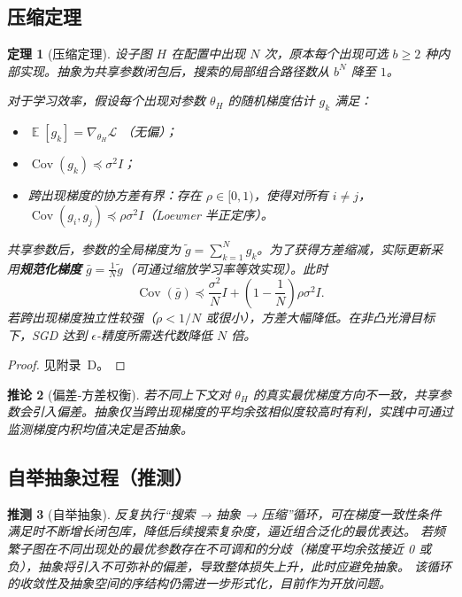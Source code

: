 \documentclass{ctexart}
\newtheorem{theorem}{定理}[section]
\newtheorem{corollary}[theorem]{推论}
\newtheorem{conjecture}[theorem]{推测}
\DeclareMathOperator{\Cov}{Cov}
\DeclareMathOperator{\E}{\mathbb{E}}
\begin{document}
\subsection{压缩定理}

\begin{theorem}[压缩定理]
设子图 $H$ 在配置中出现 $N$ 次，原本每个出现可选 $b\ge 2$ 种内部实现。抽象为共享参数闭包后，搜索的局部组合路径数从 $b^N$ 降至 $1$。

对于学习效率，假设每个出现对参数 $\theta_H$ 的随机梯度估计 $g_k$ 满足：
\begin{itemize}
    \item $\E[g_k] = \nabla_{\theta_H}\mathcal{L}$ （无偏）；
    \item $\Cov(g_k) \preceq \sigma^2 I$；
    \item 跨出现梯度的协方差有界：存在 $\rho \in [0,1)$，使得对所有 $i\neq j$， $\Cov(g_i, g_j) \preceq \rho \sigma^2 I$（Loewner 半正定序）。
\end{itemize}
共享参数后，参数的全局梯度为 $\tilde{g} = \sum_{k=1}^N g_k$。为了获得方差缩减，实际更新采用\textbf{规范化梯度} $\bar{g} = \frac{1}{N}\tilde{g}$（可通过缩放学习率等效实现）。此时
\[
\Cov(\bar{g}) \preceq \frac{\sigma^2}{N} I + \left(1-\frac1N\right)\rho\sigma^2 I.
\]
若跨出现梯度独立性较强（$\rho < 1/N$ 或很小），方差大幅降低。在非凸光滑目标下，SGD 达到 $\epsilon$-精度所需迭代数降低 $N$ 倍。
\end{theorem}
\begin{proof}
见附录~D。
\end{proof}

\begin{corollary}[偏差‑方差权衡]
若不同上下文对 $\theta_H$ 的真实最优梯度方向不一致，共享参数会引入偏差。抽象仅当跨出现梯度的平均余弦相似度较高时有利，实践中可通过监测梯度内积均值决定是否抽象。
\end{corollary}

\subsection{自举抽象过程（推测）}

\begin{conjecture}[自举抽象]
反复执行“搜索 → 抽象 → 压缩”循环，可在梯度一致性条件满足时不断增长闭包库，降低后续搜索复杂度，逼近组合泛化的最优表达。  
若频繁子图在不同出现处的最优参数存在不可调和的分歧（梯度平均余弦接近 0 或负），抽象将引入不可弥补的偏差，导致整体损失上升，此时应避免抽象。  
该循环的收敛性及抽象空间的序结构仍需进一步形式化，目前作为开放问题。
\end{conjecture}
\end{document}
